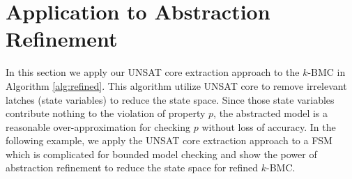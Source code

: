 \section{Application to Abstraction Refinement}
In this section we apply our UNSAT core extraction approach to the 
$k$-BMC in Algorithm \ref{alg:refined}. This algorithm utilize UNSAT core to 
remove irrelevant latches (state variables) to
reduce the state space. Since those state variables contribute nothing to the violation of 
property $p$, the abstracted model is a reasonable over-approximation for checking 
$p$ without loss of accuracy. In the following example, we apply the UNSAT core extraction 
approach to a FSM which is complicated for bounded model checking and show the power of 
abstraction refinement to reduce the state space for refined $k$-BMC.

